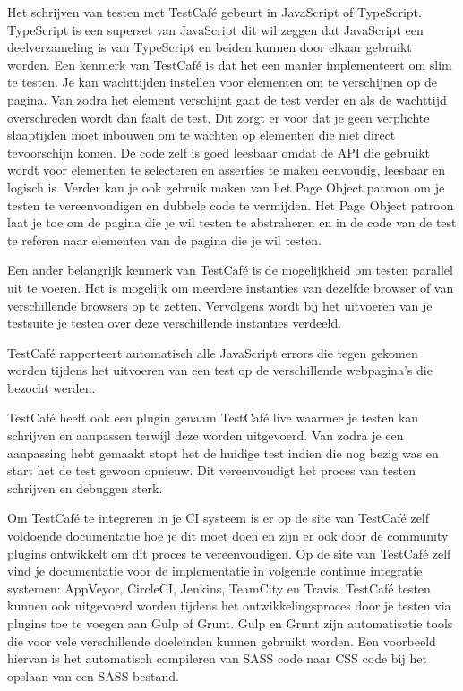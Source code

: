 Het schrijven van testen met TestCafé gebeurt in JavaScript of TypeScript. TypeScript is een superset van JavaScript dit wil zeggen dat JavaScript een deelverzameling is van TypeScript en beiden kunnen door elkaar gebruikt worden. Een kenmerk van TestCafé is dat het een manier implementeert om slim te testen. Je kan wachttijden instellen voor elementen om te verschijnen op de pagina. Van zodra het element verschijnt gaat de test verder en als de wachttijd overschreden wordt dan faalt de test. Dit zorgt er voor dat je geen verplichte slaaptijden moet inbouwen om te wachten op elementen die niet direct tevoorschijn komen. De code zelf is goed leesbaar omdat de API die gebruikt wordt voor elementen te selecteren en asserties te maken eenvoudig, leesbaar en logisch is. Verder kan je ook gebruik maken van het Page Object patroon om je testen te vereenvoudigen en dubbele code te vermijden. Het Page Object patroon laat je toe om de pagina die je wil testen te abstraheren en in de code van de test te referen naar elementen van de pagina die je wil testen. 

Een ander belangrijk kenmerk van TestCafé is de mogelijkheid om testen parallel uit te voeren. Het is mogelijk om meerdere instanties van dezelfde browser of van verschillende browsers op te zetten. Vervolgens wordt bij het uitvoeren van je \gls{testsuite} je testen over deze verschillende instanties verdeeld.

TestCafé rapporteert automatisch alle JavaScript errors die tegen gekomen worden tijdens het uitvoeren van een test op de verschillende webpagina's die bezocht werden. 

TestCafé heeft ook een plugin genaam TestCafé live waarmee je testen kan schrijven en aanpassen terwijl deze worden uitgevoerd. Van zodra je een aanpassing hebt gemaakt stopt het de huidige test indien die nog bezig was en start het de test gewoon opnieuw. Dit vereenvoudigt het proces van testen schrijven en debuggen sterk. 

Om TestCafé te integreren in je \gls{CI} systeem is er op de site van TestCafé zelf voldoende documentatie hoe je dit moet doen en zijn er ook door de community plugins ontwikkelt om dit proces te vereenvoudigen. Op de site van TestCafé zelf vind je documentatie voor de implementatie in volgende continue integratie systemen: AppVeyor, CircleCI, Jenkins, TeamCity en Travis. TestCafé testen kunnen ook uitgevoerd worden tijdens het ontwikkelingsproces door je testen via plugins toe te voegen aan Gulp of Grunt. Gulp en Grunt zijn automatisatie tools die voor vele verschillende doeleinden kunnen gebruikt worden. Een voorbeeld hiervan is het automatisch compileren van SASS code naar CSS code bij het opslaan van een SASS bestand.

